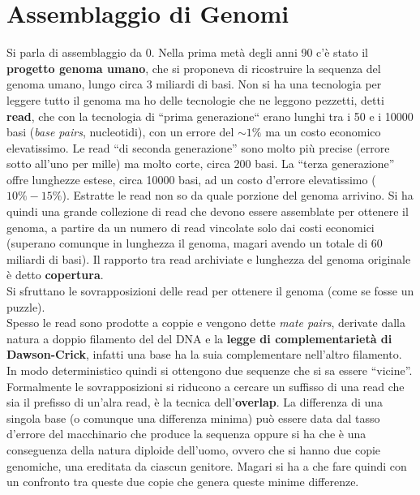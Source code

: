 \documentclass[a4paper,12pt, oneside]{book}
\begin{document}
\chapter{Assemblaggio di Genomi}
Si parla di assemblaggio da 0. Nella prima metà degli anni 90 c'è
stato il \textbf{progetto genoma umano}, che si proponeva di
ricostruire la sequenza del genoma umano, lungo circa 3 miliardi di
basi. Non si ha una tecnologia per leggere tutto il genoma ma ho
delle tecnologie che ne leggono pezzetti, detti \textbf{read}, che con
la tecnologia di ``prima generazione`` erano lunghi
tra i 50 e i 10000 basi (\textit{base pairs}, nucleotidi), con un
errore del $\sim 1\%$ ma un costo economico elevatissimo.
Le read ``di seconda generazione'' sono  molto
più precise (errore sotto all'uno per mille) ma molto corte, circa 200
basi. La ``terza generazione'' offre lunghezze estese, circa 10000
basi, ad un costo d'errore elevatissimo ($10\%-15\%$). Estratte le
read non so da quale porzione del genoma arrivino. Si ha quindi una
grande collezione di read che devono essere assemblate per ottenere il
genoma, a partire da un numero di read vincolate solo dai costi
economici (superano comunque in lunghezza il genoma, magari avendo
un totale di 60 miliardi di basi). Il rapporto tra read archiviate e
lunghezza del genoma originale è detto \textbf{copertura}.\\
Si sfruttano le sovrapposizioni delle read per ottenere il genoma
(come se fosse un puzzle).\\
Spesso le read sono prodotte a coppie e vengono dette \textit{mate
  pairs}, derivate dalla natura a doppio filamento del del DNA e la
\textbf{legge di complementarietà di Dawson-Crick}, infatti una base
ha la suia complementare nell'altro filamento. In modo deterministico
quindi si ottengono due sequenze che si sa essere ``vicine''. \\
Formalmente le sovrapposizioni si riducono a cercare un suffisso di
una read che sia il prefisso di un'alra read, è la tecnica
dell'\textbf{overlap}. La differenza di una singola base (o comunque
una differenza minima) può essere data dal tasso d'errore del
macchinario che produce la sequenza oppure si ha che è una conseguenza
della natura diploide dell'uomo, ovvero che si hanno due copie
genomiche, una ereditata da ciascun genitore. Magari si ha a che fare
quindi con un confronto tra queste due copie che genera queste minime
differenze.
\end{document}

